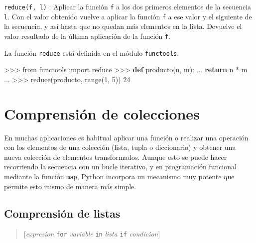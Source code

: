 \documentclass[
  spanish,
  a4paper,
]{scrreport}
\newenvironment{Shaded}{\begin{snugshade}}{\end{snugshade}}
\newcommand{\BuiltInTok}[1]{\textcolor[rgb]{0.00,0.23,0.31}{#1}}
\newcommand{\ControlFlowTok}[1]{\textcolor[rgb]{0.00,0.23,0.31}{\textbf{#1}}}
\newcommand{\DecValTok}[1]{\textcolor[rgb]{0.68,0.00,0.00}{#1}}
\newcommand{\ImportTok}[1]{\textcolor[rgb]{0.00,0.46,0.62}{#1}}
\newcommand{\KeywordTok}[1]{\textcolor[rgb]{0.00,0.23,0.31}{\textbf{#1}}}
\newcommand{\NormalTok}[1]{\textcolor[rgb]{0.00,0.23,0.31}{#1}}
\newcommand{\OperatorTok}[1]{\textcolor[rgb]{0.37,0.37,0.37}{#1}}
\begin{document}
\texttt{reduce(f,\ l)} : Aplicar la función \texttt{f} a los dos
primeros elementos de la secuencia \texttt{l}. Con el valor obtenido
vuelve a aplicar la función \texttt{f} a ese valor y el siguiente de la
secuencia, y así hasta que no quedan más elementos en la lista. Devuelve
el valor resultado de la última aplicación de la función \texttt{f}.

La función \texttt{reduce} está definida en el módulo
\texttt{functools}.

\begin{Shaded}
\begin{Highlighting}[]
\OperatorTok{\textgreater{}\textgreater{}\textgreater{}} \ImportTok{from}\NormalTok{ functools }\ImportTok{import} \BuiltInTok{reduce}
\OperatorTok{\textgreater{}\textgreater{}\textgreater{}} \KeywordTok{def}\NormalTok{ producto(n, m):}
\NormalTok{...     }\ControlFlowTok{return}\NormalTok{ n }\OperatorTok{*}\NormalTok{ m}
\NormalTok{...}
\OperatorTok{\textgreater{}\textgreater{}\textgreater{}} \BuiltInTok{reduce}\NormalTok{(producto, }\BuiltInTok{range}\NormalTok{(}\DecValTok{1}\NormalTok{, }\DecValTok{5}\NormalTok{))}
\DecValTok{24}
\end{Highlighting}
\end{Shaded}


\chapter{Comprensión de
colecciones}\label{comprensiuxf3n-de-colecciones}

En muchas aplicaciones es habitual aplicar una función o realizar una
operación con los elementos de una colección (lista, tupla o
diccionario) y obtener una nueva colección de elementos transformados.
Aunque esto se puede hacer recorriendo la secuencia con un bucle
iterativo, y en programación funcional mediante la función \texttt{map},
Python incorpora un mecanismo muy potente que permite esto mismo de
manera más simple.

\section{Comprensión de listas}\label{comprensiuxf3n-de-listas}

\begin{quote}
{[}\emph{expresion} \texttt{for} \emph{variable} \texttt{in}
\emph{lista} \texttt{if} \emph{condicion}{]}
\end{quote}
\end{document}
